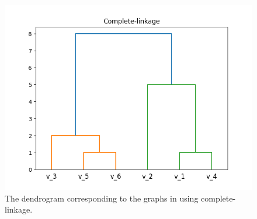 \documentclass[a4paper, 12pt]{article}
\numberwithin{equation}{section}
\numberwithin{figure}{section}
\theoremstyle{definition}
\begin{document}
\begin{figure}[h]
	\centering 
	\includegraphics[scale=0.75]{graphics/clink.png}
	\caption{The dendrogram corresponding to the graphs in  using complete-linkage.}
	\label{fig:dendrogram-clink}	
\end{figure}
































\fi


\newpage
\end{document}
